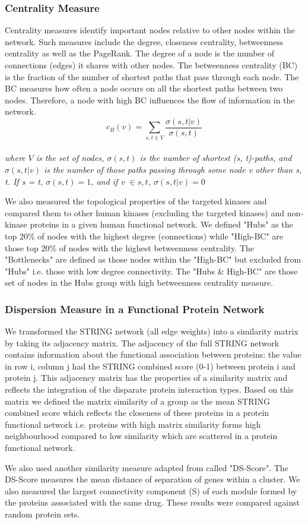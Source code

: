 \documentclass[a4paper, 11pt]{report}
\begin{document}
\subsubsection{Centrality Measure}
Centrality measures identify important nodes relative to other nodes within the network. Such measures include the degree, closeness centrality, betweenness centrality as well as the PageRank. The degree of a node is the number of connections (edges) it shares with other nodes. The betweenness centrality (BC) is the fraction of the number of shortest paths that pass through each node. The BC measures how often a node occurs on all the shortest paths between two nodes. Therefore, a node with high BC influences the flow of information in the network. \[c_B(v) =\sum_{s,t \in V} \frac{\sigma(s, t|v)}{\sigma(s, t)}\]\\
\textit{where $V$ is the set of nodes, $\sigma(s, t)$ is the number of shortest (s, t)-paths, and $\sigma(s, t|v)$ is the number of those paths passing through some node v other than s, t. If s = t, $\sigma(s, t) = 1$, and if v $\in {s, t}$, $\sigma(s, t|v) = 0$}\par
We also measured the topological properties of the targeted kinases and compared them to other human kinases (excluding the targeted kinases) and non-kinase proteins in a given human functional network. We defined "Hubs" as the top 20\% of nodes with the highest degree (connections) while "High-BC" are those top 20\% of nodes with the highest betweenness centrality. The "Bottlenecks" are defined as those nodes within the "High-BC" but excluded from "Hubs" i.e. those with low degree connectivity. The "Hubs \& High-BC" are those set of nodes in the Hubs group with high betweenness centrality measure. 
\subsubsection{Dispersion Measure in a Functional Protein Network}
We transformed the STRING network \cite{szklarczyk2014string} (all edge weights) into a similarity matrix by taking its adjacency matrix. The adjacency of the full STRING network contains information about the functional association between proteins: the value in row i, column j had the STRING combined score (0-1) between protein i and protein j. This adjacency matrix has the properties of a similarity matrix and reflects the integration of the disparate protein interaction types. Based on this matrix we defined the matrix similarity of a group as the mean STRING combined score which reflects the closeness of these proteins in a protein functional network i.e. proteins with high matrix similarity forms high neighbourhood compared to low similarity which are scattered in a protein functional network. \par
We also used another similarity measure adapted from \cite{menche2015uncovering} called "DS-Score". The DS-Score measures the mean distance of separation of genes within a cluster. We also measured the largest connectivity component (S) of each module formed by the proteins associated with the same drug. These results were compared against random protein sets.
\end{document}
